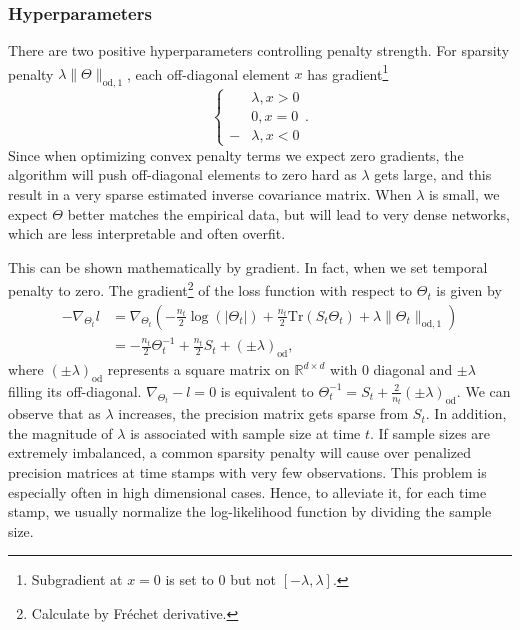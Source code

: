\subsubsection{Hyperparameters}
There are two positive hyperparameters controlling penalty strength. 
For sparsity penalty $\lambda\|\Theta\|_{\text{od}, 1}$, 
each off-diagonal element $x$ has gradient\footnote{Subgradient at $x=0$ is set to 0 but not $[-\lambda,\lambda]$.}
\begin{equation*}
    \left\{\begin{aligned}
        &\lambda, x>0 \\
        &0, x=0 \\
        -&\lambda, x<0
    \end{aligned}\right..
\end{equation*}
Since when optimizing convex penalty terms we expect zero gradients, 
the algorithm will push off-diagonal elements to zero hard as $\lambda$ gets large, 
and this result in a very sparse estimated inverse covariance matrix. 
When $\lambda$ is small, we expect $\Theta$ better matches the empirical data, 
but will lead to very dense networks, 
which are less interpretable and often overfit. 

This can be shown mathematically by gradient. 
In fact, when we set temporal penalty to zero. The gradient\footnote{Calculate by Fr\'echet derivative.} of the loss function with respect to $\Theta_t$ is given by 
\begin{align*}
    -\nabla_{\Theta_t}l &= \nabla_{\Theta_t}\left(-\frac{n_t}{2}\log(|\Theta_t|)+\frac{n_t}{2}\text{Tr}(S_t\Theta_t) + \lambda\|\Theta_t\|_{\text{od}, 1}\right) \\
                                  &= -\frac{n_t}{2}\Theta_t^{-1} + \frac{n_t}{2}S_t + (\pm\lambda)_{\text{od}},
\end{align*}
where $(\pm\lambda)_{\text{od}}$ represents a square matrix on $\mathbb{R}^{d\times d}$ with 0 diagonal and $\pm\lambda$ filling its off-diagonal. 
$\nabla_{\Theta_t}-l=0$ is equivalent to $\Theta_t^{-1}=S_t+\frac{2}{n_t}(\pm\lambda)_{\text{od}}$.
We can observe that as $\lambda$ increases, the precision matrix gets sparse from $S_t$. 
In addition, the magnitude of $\lambda$ is associated with sample size at time $t$. 
If sample sizes are extremely imbalanced, 
a common sparsity penalty will cause over penalized precision matrices at time stamps with very few observations. 
This problem is especially often in high dimensional cases.
Hence, to alleviate it, for each time stamp, we usually normalize the log-likelihood function by dividing the sample size. 

